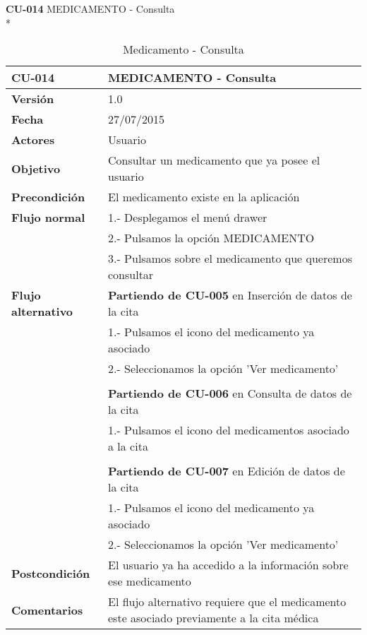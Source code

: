 \documentclass[../pfc.tex]{subfiles}
\begin{document}
		\textbf{CU-014}	MEDICAMENTO - Consulta\\*
		
		\begin{table}[H]
			\centering
			\begin{tabular}[t]{|p{3cm}|p{9.5cm}|}
				\hline \textbf{CU-014} & \textbf{MEDICAMENTO - Consulta} \\*
				\hline\hline \textbf{Versión} & 1.0 \\*
				\hline\hline \textbf{Fecha} & 27/07/2015 \\*
				\hline\textbf{Actores} 	& Usuario\\*
				\hline \textbf{Objetivo} & Consultar un medicamento que ya posee el usuario\\* 			
				\hline \textbf{Precondición} & El medicamento existe en la aplicación\\* 
				\hline \textbf{Flujo normal} & 1.- Desplegamos el menú drawer \\* 
				& 2.- Pulsamos la opción MEDICAMENTO\\*	
				& 3.- Pulsamos sobre el medicamento que queremos consultar\\*	
				\hline \textbf{Flujo alternativo} & \textbf{Partiendo de CU-005} en Inserción de datos de la cita\\* 
				& 1.- Pulsamos el icono del medicamento ya asociado\\*	
				& 2.- Seleccionamos la opción 'Ver medicamento'\\*
				& \\*
				& \textbf{Partiendo de CU-006} en Consulta de datos de la cita\\* 
				& 1.- Pulsamos el icono del medicamentos asociado a la cita\\*	
				& \\*
				& \textbf{Partiendo de CU-007} en Edición de datos de la cita\\* 
				& 1.- Pulsamos el icono del medicamento ya asociado\\*	
				& 2.- Seleccionamos la opción 'Ver medicamento'\\*
				\hline \textbf{Postcondición} & El usuario ya ha accedido a la información sobre ese medicamento \\* 
				\hline \textbf{Comentarios}   & El flujo alternativo requiere que el medicamento este asociado previamente a la cita médica\\*
				\hline
			\end{tabular}
			\caption{Medicamento - Consulta}
			\label{tabla:caso014}
		\end{table}
		
\end{document}

